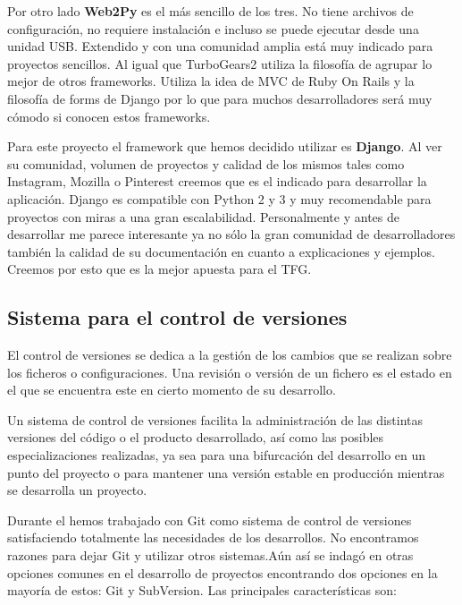 \bigskip
Por otro lado \textbf{Web2Py} es el más sencillo de los tres. No tiene archivos de configuración, no requiere instalación e incluso se puede ejecutar desde una unidad USB. Extendido y con una comunidad amplia está muy indicado para proyectos sencillos. Al igual que TurboGears2 utiliza la filosofía de agrupar lo mejor de otros frameworks. Utiliza la idea de MVC de Ruby On Rails  y la filosofía de forms de Django por lo que para muchos desarrolladores será muy cómodo si conocen estos frameworks.


\bigskip
Para este proyecto el framework que hemos decidido utilizar es \textbf{Django}. Al ver su comunidad, volumen de proyectos y calidad de los mismos tales como Instagram, Mozilla o Pinterest \cite{djangoproject} creemos que es el indicado para desarrollar la aplicación. Django es compatible con Python 2 y 3 y muy recomendable para proyectos con miras a una gran escalabilidad. Personalmente y antes de desarrollar {\titulo} me parece interesante ya no sólo la gran comunidad de desarrolladores también la calidad de su documentación en cuanto a explicaciones y ejemplos. Creemos por esto que es la mejor apuesta para el TFG.



\subsection{Sistema para el control de versiones}

El control de versiones se dedica a la gestión de los cambios que se realizan sobre los ficheros o configuraciones. Una revisión o versión de un fichero es el estado en el que se encuentra este en cierto momento de su desarrollo.

\bigskip
Un sistema de control de versiones facilita la administración de las distintas versiones del código o el producto desarrollado, así como las posibles especializaciones realizadas, ya sea para una bifurcación del desarrollo en un punto del proyecto o para mantener una versión estable en producción mientras se desarrolla un proyecto.

\bigskip
Durante el {\grado} hemos trabajado con Git como sistema de control de versiones satisfaciendo totalmente las necesidades de los desarrollos. No encontramos razones para dejar Git y utilizar otros sistemas.Aún así se indagó en otras opciones comunes en el desarrollo de proyectos encontrando dos opciones en la mayoría de estos: Git y SubVersion. Las principales características son:

